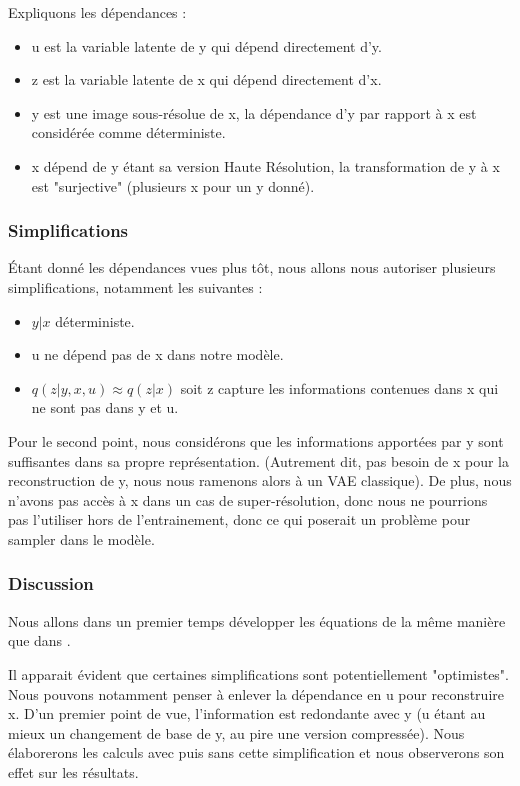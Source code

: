 \documentclass{article}
\begin{document}
Expliquons les dépendances :
\begin{itemize}
    \item u est la variable latente de y qui dépend directement d'y.
    \item z est la variable latente de x qui dépend directement d'x.
    \item y est une image sous-résolue de x, la \textcolor{deporange}{dépendance} d'y par rapport à x est considérée comme déterministe.
    \item x dépend de y étant sa version Haute Résolution, la transformation de y à x est "surjective" (plusieurs x pour un y donné).
\end{itemize}

\subsubsection{Simplifications}\label{simp}

Étant donné les dépendances vues plus tôt, nous allons nous autoriser plusieurs simplifications, notamment les suivantes :
\begin{itemize}
    \item $y|x$ déterministe.
    \item u ne dépend pas de x dans notre modèle. 
    \item $q(z|y,x,u) \approx q(z|x)$ soit z capture les informations contenues dans x qui ne sont pas dans y et u.
\end{itemize}
Pour le second point, nous considérons que les informations apportées par y sont suffisantes dans sa propre représentation. (Autrement dit, pas besoin de x pour la reconstruction de y, nous nous ramenons alors à un VAE classique).
De plus, nous n'avons pas accès à x dans un cas de super-résolution, donc nous ne pourrions pas l'utiliser hors de l'entrainement, donc ce qui poserait un problème pour sampler dans le modèle.

\subsubsection{Discussion}
Nous allons dans un premier temps développer les équations de la même manière que dans \cite{gatopoulos2020Superresolution}.

Il apparait évident que certaines simplifications sont potentiellement "optimistes". Nous pouvons notamment penser à enlever la dépendance en u pour reconstruire x. D'un premier point de vue, l'information est redondante avec y (u étant au mieux un changement de base de y, au pire une version compressée). Nous élaborerons les calculs avec puis sans cette simplification et nous observerons son effet sur les résultats.
\end{document}
